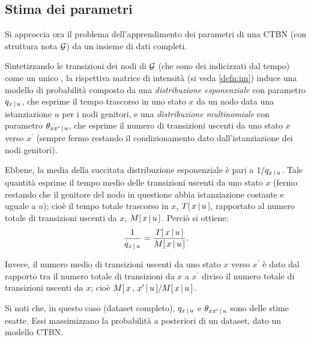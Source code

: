 \subsection{Stima dei parametri}
\label{sec:ctbn-params}
Si approccia ora il problema dell'apprendimento dei parametri di una \acl{CTBN} (con struttura nota $\mathcal{G}$) da un insieme di dati completi.

Sintetizzando le transizioni dei nodi di $\mathcal{G}$ (che sono dei \conm\mprocess{} indicizzati dal tempo) come un unico \homm\mprocess{}, la rispettiva matrice di intensità (si veda \ref{defn:im}) induce una modello di probabilità composto da una \emph{distribuzione esponenziale} con parametro $q_{x\,\arrowvert\,u}$, che esprime il tempo trascorso in uno stato $x$ da un nodo data una istanziazione $u$ per i nodi genitori, e una \emph{distribuzione multinomiale} con parametro $\theta_{xx^\prime\,\arrowvert\,u}$, che esprime il numero di transizioni uscenti da uno stato $x$ verso $x^\prime$ (sempre fermo restando il condizionamento dato dall'istanziazione dei nodi genitori).

Ebbene, la media della succitata distribuzione esponenziale è pari a $1/q_{x\,\arrowvert\,u}$. Tale quantità esprime il tempo medio delle transizioni uscenti da uno stato $x$ (fermo restando che il genitore del nodo in questione abbia istanziazione costante e uguale a $u$); cioè il tempo totale trascorso in $x$, $T[\,x\,\arrowvert\,u\,]$, rapportato al numero totale di transizioni uscenti da $x$, $\mstat{x\,\arrowvert\,u}$. Perciò si ottiene:
\[
\frac{1}{q_{x\,\arrowvert\,u}}=\frac{\tstat{x\,\arrowvert\,u}}{\mstat{x\,\arrowvert\,u}}\text{.}
\]

Invece, il numero medio di transizioni uscenti da uno stato $x$ verso $x^\prime$ è dato dal rapporto tra il numero totale di transizioni da $x$ a $x^\prime$ diviso il numero totale di transizioni uscenti da $x$; cioè $\mstat[x]{x^\prime\,\arrowvert\,u}/\mstat{x\,\arrowvert\,u}$.

Si noti che, in questo caso (dataset completo), $q_{x\,\arrowvert\,u}$ e $\theta_{xx^\prime\,\arrowvert\,u}$ sono delle stime esatte. Essi massimizzano la probabilità a posteriori di un dataset, dato un modello \acs{CTBN}.

